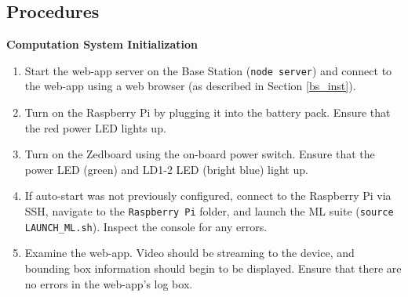 
\newcommand{\checkbox}{\makebox[3ex][r]{\Large{$\square$}}}

\newenvironment{checklist}[1]{%
  \renewcommand{\item}[2]{%
    ##1\dotfill\makebox{\uppercase{##2}}\\
  }
  \newcommand{\step}[1]{%
    \hspace*{10em}-\hspace*{\labelsep}##1\\
  }
  \begin{tabular}{p{0.9\linewidth}}
     \toprule
       \multicolumn{1}{c}{\textbf{\uppercase{#1}}}\\
     \midrule
}{\bottomrule\end{tabular}\vspace{1em}}


\subsection{Procedures}

\textbf{Computation System Initialization}
\begin{enumerate}
\item Start the web-app server on the Base Station (\texttt{node server}) and connect to the web-app using a web browser (as described in Section \ref{bs_inst}).
\item Turn on the Raspberry Pi by plugging it into the battery pack. Ensure that the red power LED lights up.
\item Turn on the Zedboard using the on-board power switch. Ensure that the power LED (green) and LD1-2 LED (bright blue) light up.
\item If auto-start was not previously configured, connect to the Raspberry Pi via SSH, navigate to the \texttt{Raspberry Pi} folder, and launch the ML suite (\texttt{source LAUNCH\_ML.sh}). Inspect the console for any errors.
\item Examine the web-app. Video should be streaming to the device, and bounding box information should begin to be displayed. Ensure that there are no errors in the web-app's log box.
\end{enumerate}

